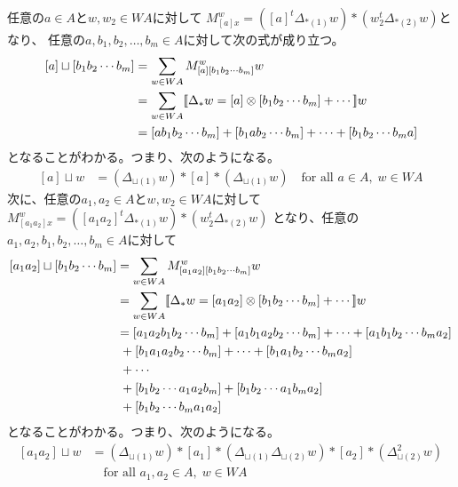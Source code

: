 		任意の$a\in A$と$w,w_2\in WA$に対して
		$M_{[a]x}^w=([a]^t\Delta_{*(1)}w)*(w_2^t\Delta_{*(2)}w)$となり、
		任意の$a,b_1,b_2,\dots,b_m\in A$に対して次の式が成り立つ。
		\begin{equation*}\begin{split} %
			[a]\sqcup [b_1b_2\cdots b_m]
			&= \sum_{w\in WA}M_{[a][b_1b_2\cdots b_m]}^ww \\
			&= \sum_{w\in WA}\jump{\Delta_*w=[a]\otimes [b_1b_2\cdots b_m]+\cdots}w \\
			&= [ab_1b_2\cdots b_m] + [b_1ab_2\cdots b_m]
				+ \cdots + [b_1b_2\cdots b_ma] \\
		\end{split}\end{equation*} %
		となることがわかる。つまり、次のようになる。
		\begin{equation*}\begin{split} %
			[a]\sqcup w &= (\Delta_{\sqcup(1)}w)*[a]*(\Delta_{\sqcup(1)}w)
			\quad\text{for all }a\in A,\;w\in WA
		\end{split}\end{equation*} %
		次に、任意の$a_1,a_2\in A$と$w,w_2\in WA$に対して
		$M_{[a_1a_2]x}^w=([a_1a_2]^t\Delta_{*(1)}w)*(w_2^t\Delta_{*(2)}w)$
		となり、任意の$a_1,a_2,b_1,b_2,\dots,b_m\in A$に対して
		\begin{equation*}\begin{split} %
			[a_1a_2]\sqcup [b_1b_2\cdots b_m]
			&= \sum_{w\in WA}M_{[a_1a_2][b_1b_2\cdots b_m]}^ww \\
			&= \sum_{w\in WA}\jump{\Delta_*w=[a_1a_2]\otimes [b_1b_2\cdots b_m]+\cdots}w \\
			&= [a_1a_2b_1b_2\cdots b_m] + [a_1b_1a_2b_2\cdots b_m]
				+ \cdots + [a_1b_1b_2\cdots b_ma_2] \\
			&\;+ [b_1a_1a_2b_2\cdots b_m] + \cdots + [b_1a_1b_2\cdots b_ma_2] \\
			&\;+ \cdots \\
			&\;+ [b_1b_2\cdots a_1a_2b_m] + [b_1b_2\cdots a_1b_ma_2] \\
			&\;+ [b_1b_2\cdots b_ma_1a_2] \\
		\end{split}\end{equation*} %
		となることがわかる。つまり、次のようになる。
		\begin{equation*}\begin{split} %
			[a_1a_2]\sqcup w
			&= (\Delta_{\sqcup(1)}w)*[a_1]
			*(\Delta_{\sqcup(1)}\Delta_{\sqcup(2)}w)*[a_2]
			*(\Delta_{\sqcup(2)}^2w) \\
			&\quad\text{for all }a_1,a_2\in A,\;w\in WA
		\end{split}\end{equation*} %
